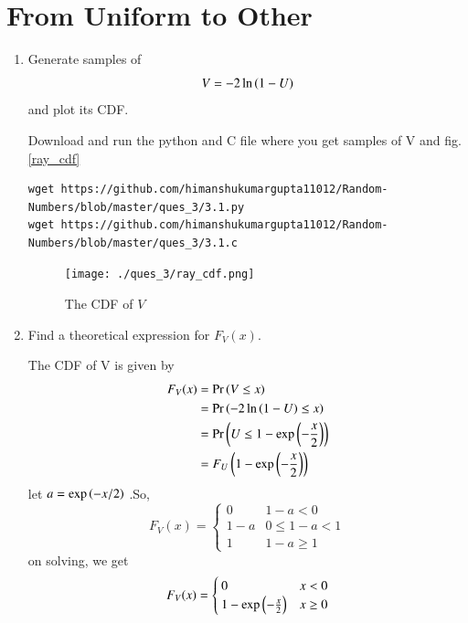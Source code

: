 \documentclass[journal,12pt,twocolumn]{IEEEtran}
\renewcommand\thesection{\arabic{section}}
\begin{document}
	\section{From Uniform to Other}
	\begin{enumerate}[label=\thesection.\arabic*
		,ref=\thesection.\theenumi]
		\item
		Generate samples of 
		\begin{equation}
			V = -2\ln\left(1-U\right)
		\end{equation}
		and plot its CDF.  
		
		\solution Download and run the python and C file where you get samples of V and fig. \ref{ray_cdf}
		\begin{lstlisting}
wget https://github.com/himanshukumargupta11012/Random-Numbers/blob/master/ques_3/3.1.py
wget https://github.com/himanshukumargupta11012/Random-Numbers/blob/master/ques_3/3.1.c
		\end{lstlisting}
		\begin{figure}
			\centering
			\texttt{[image: ./ques\_3/ray\_cdf.png]}
			\caption{The CDF of $V$}
			\label{fig:1}
		\end{figure}
		\item Find a theoretical expression for $F_V(x)$.
		
		\solution The CDF of V is given by 
		\begin{align}
			F_V(x)&=\Pr\left(V\leq x\right)\\
			&=\Pr\left(-2\ln\left(1-U\right) \leq x\right)\\
			&=\Pr\left(U\leq 1-\exp\left(-\frac{x}{2}\right)\right)\\
			&=F_U\left(1-\exp\left(-\frac{x}{2}\right)\right)
		\end{align}
		let $a=\exp\left(-x/2\right)$ .So,
		\[
		F_V(x)=
		\begin{cases}
			0&  1-a<0\\
			1-a  &  0 \leq 1-a < 1\\
			1&  1-a\geq1	
		\end{cases}
		\]
		on solving, we get
		\[
		F_V(x)=
		\begin{cases}
			0&  x<0\\
			1-\exp\left(-\frac{x}{2}\right)  &  x\geq0
		\end{cases}
		\]
	\end{enumerate}
\end{document}
